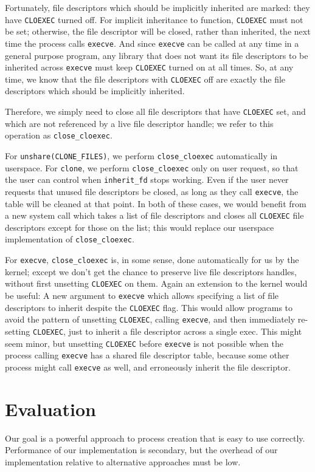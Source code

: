 \documentclass[letterpaper,twocolumn,10pt]{article}
\begin{document}
Fortunately, file descriptors which should be implicitly inherited are marked:
they have \texttt{CLOEXEC} turned off.
For implicit inheritance to function, \texttt{CLOEXEC} must not be set;
otherwise, the file descriptor will be closed, rather than inherited,
the next time the process calls \texttt{execve}.
And since \texttt{execve} can be called at any time in a general purpose program,
any library that does not want its file descriptors to be inherited across \texttt{execve}
must keep \texttt{CLOEXEC} turned on at all times.
So, at any time, we know that the file descriptors with \texttt{CLOEXEC} off
are exactly the file descriptors which should be implicitly inherited.

Therefore, we simply need to close all file descriptors that have \texttt{CLOEXEC} set,
and which are not referenced by a live file descriptor handle;
we refer to this operation as \verb|close_cloexec|.

For \verb|unshare(CLONE_FILES)|, we perform \verb|close_cloexec| automatically in userspace.
For \texttt{clone}, we perform \verb|close_cloexec| only on user request,
so that the user can control when \verb|inherit_fd| stops working.
Even if the user never requests that unused file descriptors be closed,
as long as they call \texttt{execve}, the table will be cleaned at that point.
In both of these cases,
we would benefit from a new system call which takes a list of file descriptors
and closes all \texttt{CLOEXEC} file descriptors except for those on the list;
this would replace our userspace implementation of \verb|close_cloexec|.

For \texttt{execve}, \verb|close_cloexec| is, in some sense, done automatically for us by the kernel;
except we don't get the chance to preserve live file descriptors handles,
without first unsetting \texttt{CLOEXEC} on them.
Again an extension to the kernel would be useful:
A new argument to \texttt{execve} which allows specifying a list of file descriptors to inherit
despite the \texttt{CLOEXEC} flag.
This would allow programs to avoid the pattern
of unsetting \texttt{CLOEXEC}, calling \texttt{execve}, and then immediately re-setting \texttt{CLOEXEC},
just to inherit a file descriptor across a single exec.
This might seem minor,
but unsetting \texttt{CLOEXEC} before \texttt{execve} is not possible
when the process calling \texttt{execve} has a shared file descriptor table,
because some other process might call \texttt{execve} as well,
and erroneously inherit the file descriptor.
\section{Evaluation}\label{evaluation}
Our goal is a powerful approach to process creation that is easy to use correctly.
Performance of our implementation is secondary,
but the overhead of our implementation relative to alternative approaches
must be low.
\end{document}

